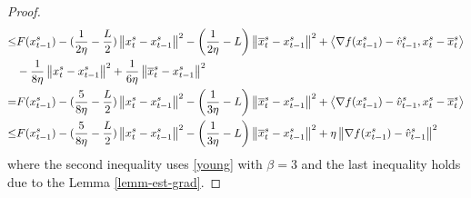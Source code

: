 \documentclass{article}
\newcommand{\norm}[1]{\left\lVert#1\right\rVert}
\newcommand{\Iprod}[2]{\left\langle #1,#2\right\rangle}
\theoremstyle{definition}
\theoremstyle{remark}
\begin{document}
\begin{proof}
\begin{align}
 \leq & F({x}_{t-1}^s)  -(\frac{1}{2\eta} - \frac{L}{2})\norm{{x}_t^s-x_{t-1}^s}^2- \left(\frac{1}{2\eta}-L\right)\norm{\overline{x}_t^s-x_{t-1}^s}^2+\Iprod{\nabla f(x_{t-1}^s)-\hat{v}_{t-1}^s}{x_t^s - \overline{x}_t^s}\notag\\
 & -\frac{1}{8\eta} \norm{x_t^s-{x}_{t-1}^s}^2 + \frac{1}{6\eta} \norm{\overline{x}_{t}^s-{x}_{t-1}^s}^2\label{eq18}\\
  = &  F({x}_{t-1}^s)  -(\frac{5}{8\eta} - \frac{L}{2})\norm{{x}_t^s-x_{t-1}^s}^2- \left(\frac{1}{3\eta}-L\right)\norm{\overline{x}_t^s-x_{t-1}^s}^2+\Iprod{\nabla f(x_{t-1}^s)-\hat{v}_{t-1}^s}{x_t^s - \overline{x}_t^s}\notag\\
  \leq & F({x}_{t-1}^s)  -(\frac{5}{8\eta} - \frac{L}{2})\norm{{x}_t^s-x_{t-1}^s}^2- \left(\frac{1}{3\eta}-L\right)\norm{\overline{x}_t^s-x_{t-1}^s}^2+\eta \norm{\nabla f(x_{t-1}^s)-\hat{v}_{t-1}^s}^2\label{eq19}
 \end{align}
 where the second inequality uses \eqref{young} with $\beta = 3$ and the last inequality holds due to the Lemma \ref{lemm-est-grad}.
 

\end{proof}
\end{document}
